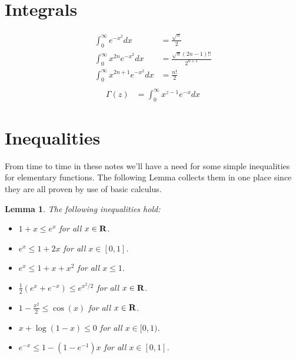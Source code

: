 \documentclass{amsart}
\newtheorem{lem}[thm]{Lemma}
\theoremstyle{remark}
\theoremstyle{definition}
\begin{document}
\section{Integrals}
\begin{align*}
\int_0^\infty e^{-x^2} dx &= \frac{\sqrt{\pi}}{2} \\
\int_0^\infty x^{2n} e^{-x^2} dx &= \frac{\sqrt{\pi} \left(2n-1\right)!!}{2^{n+1}} \\
\int_0^\infty x^{2n+1} e^{-x^2} dx &= \frac{n!}{2}\\
\end{align*}
\begin{align*}
\Gamma(z) &= \int_0^\infty x^{z-1} e^{-x} dx
\end{align*}
\section{Inequalities}
From time to time in these notes we'll have a need for some simple
inequalities for elementary functions.  The following Lemma collects
them in one place since they are all proven by use of basic calculus.
\begin{lem}\label{BasicExponentialInequalities}The following
  inequalities hold:
\begin{itemize}
\item[(i)] $1+x \leq e^x$ for all $x \in \bold{R}$.
\item[(ii)] $e^x \leq 1 + 2x$ for all $x \in [0,1]$.
\item[(iii)] $e^x \leq 1 + x + x^2$ for all $x \leq 1$.
\item[(iv)] $\frac{1}{2}(e^x + e^{-x}) \leq e^{x^2/2}$ for all $x \in \bold{R}$.
\item[(v)] $1 - \frac{x^2}{2} \leq \cos(x)$ for all $x \in \bold{R}$.
\item[(vi)] $x + \log(1-x) \leq 0$ for all $x \in [0,1)$.
\item[(vii)] $e^{-x} \leq 1 - (1 - e^{-1}) x$ for all $x \in [0,1]$.
\end{itemize}
\end{lem}
\end{document}
